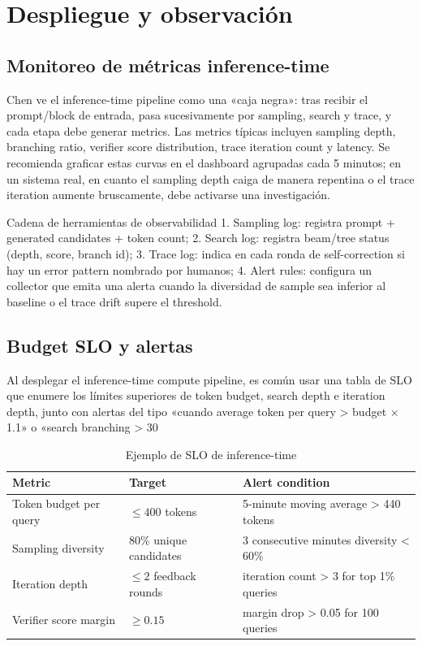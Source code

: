 \section{Despliegue y observación}

\subsection{Monitoreo de métricas inference-time}
Chen ve el inference-time pipeline como una «caja negra»: tras recibir el prompt/block de entrada, pasa sucesivamente por sampling, search y trace, y cada etapa debe generar metrics. Las metrics típicas incluyen sampling depth, branching ratio, verifier score distribution, trace iteration count y latency. Se recomienda graficar estas curvas en el dashboard agrupadas cada 5 minutos; en un sistema real, en cuanto el sampling depth caiga de manera repentina o el trace iteration aumente bruscamente, debe activarse una investigación.

\begin{knowledgebox}{Cadena de herramientas de observabilidad}
1. Sampling log: registra prompt + generated candidates + token count; 2. Search log: registra beam/tree status (depth, score, branch id); 3. Trace log: indica en cada ronda de self-correction si hay un error pattern nombrado por humanos; 4. Alert rules: configura un collector que emita una alerta cuando la diversidad de sample sea inferior al baseline o el trace drift supere el threshold.
\end{knowledgebox}

\subsection{Budget SLO y alertas}
Al desplegar el inference-time compute pipeline, es común usar una tabla de SLO que enumere los límites superiores de token budget, search depth e iteration depth, junto con alertas del tipo «cuando average token per query > budget × 1.1» o «search branching > 30%

\begin{table}[H]
\centering
\caption{Ejemplo de SLO de inference-time}
\begin{tabular}{p{}p{}p{}}
\toprule
Metric & Target & Alert condition \\
\midrule
Token budget per query & $\leq 400$ tokens & 5-minute moving average > 440 tokens \\
Sampling diversity & 80\% unique candidates & 3 consecutive minutes diversity < 60\% \\
Iteration depth & $\leq 2$ feedback rounds & iteration count > 3 for top 1\% queries \\
Verifier score margin & $\geq 0.15$ & margin drop > 0.05 for 100 queries \\
\bottomrule
\end{tabular}
\end{table}

